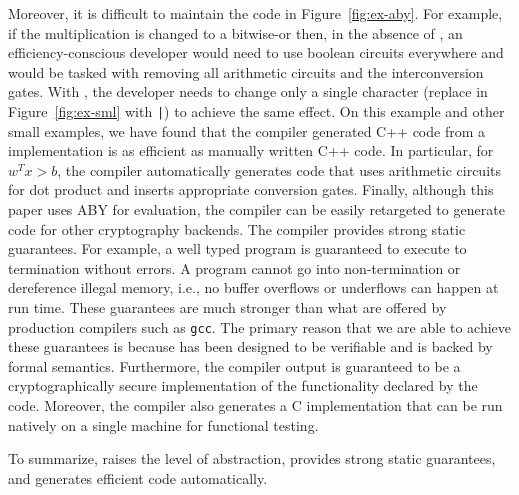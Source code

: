 Moreover, it is difficult to maintain the code in Figure~\ref{fig:ex-aby}.
For example, if the multiplication is changed to a bitwise-or then,
in the absence of \tool, an efficiency-conscious developer would need to  use boolean circuits everywhere and would be tasked with removing all arithmetic circuits and the interconversion gates. 
 With \tool, the developer needs to change only a single character (replace {\tt *} in Figure~\ref{fig:ex-sml} with {\tt |}) to achieve the same effect. 
On this example and other small examples, we have found that the compiler generated C++ code from a \tool implementation is as efficient as manually written C++ code. In particular, for $w^Tx>b$, the compiler automatically generates code that uses arithmetic circuits for dot product and inserts appropriate conversion gates. Finally, although this paper uses ABY for evaluation, the  compiler can be easily retargeted to generate code for other cryptography backends.
The \tool compiler provides strong static guarantees. For example, a well typed
\tool program is guaranteed to execute to termination without errors. A \tool program cannot go into non-termination or dereference illegal memory, i.e., no buffer overflows or underflows can happen at run time. These guarantees are
much stronger than what are offered by production compilers such as {\tt gcc}.
The primary reason that we are able to achieve these guarantees is because
\tool has been designed to be verifiable and is backed by formal semantics. 
Furthermore, the compiler output is guaranteed to be a cryptographically secure
implementation of the functionality declared by the \tool code. 
Moreover, the \tool compiler also generates a C implementation that can be run natively on a single machine for functional testing. 

To summarize, \tool raises the level of abstraction, provides strong static guarantees, and generates efficient code automatically.
